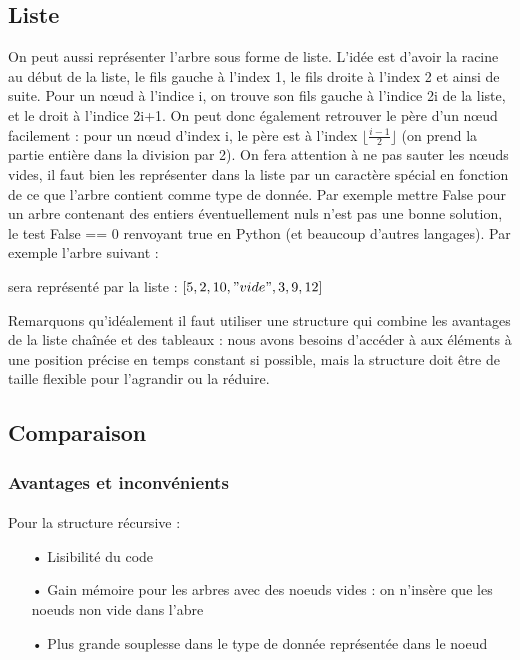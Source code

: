 \documentclass{article}
\begin{document}
\subsection{Liste}
On peut aussi représenter l'arbre sous forme de liste. L'idée est d'avoir la racine au début de la liste, le fils gauche à l'index 1, le fils droite à l'index 2 et ainsi de suite. Pour un nœud à l'indice i, on trouve son fils gauche à l'indice 2i de la liste, et le droit à l'indice 2i+1. 
On peut donc également retrouver le père d'un nœud facilement : pour un nœud d'index i, le père est à l'index $\lfloor \frac{i-1}{2} \rfloor$ (on prend la partie entière dans la division par 2).
On fera attention à ne pas sauter les nœuds vides, il faut bien les représenter dans la liste par un caractère spécial en fonction de ce que l'arbre contient comme type de donnée. Par exemple mettre False pour un arbre contenant des entiers éventuellement nuls n'est pas une bonne solution, le test False == 0 renvoyant true en Python (et beaucoup d'autres langages).
Par exemple l'arbre suivant :

\begin{center}
\end{center}

sera représenté par la liste :
$[5,2,10,"vide",3,9,12]$

Remarquons qu'idéalement il faut utiliser une structure qui combine les avantages de la liste chaînée et des tableaux : nous avons besoins d'accéder à aux éléments à une position précise en temps constant si possible, mais la structure doit être de taille flexible pour l'agrandir ou la réduire. 
\subsection{Comparaison}
\subsubsection{Avantages et inconvénients}
\paragraph*{}
Pour la structure récursive :
\begin{itemize}
\item[•]
Lisibilité du code
\item[•]
Gain mémoire pour les arbres avec des noeuds vides : on n'insère que les noeuds non vide dans l'abre
\item[•]
Plus grande souplesse dans le type de donnée représentée dans le noeud
\end{itemize}
\end{document}
